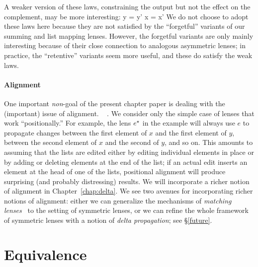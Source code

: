 \iffull
A weaker version of these laws, constraining the output but not the effect
on the complement, may be more interesting:
%
{
  {y = y'}
  {x = x'}
}
%
  We do not choose to adopt these laws here because they are not satisfied
  by the ``forgetful'' variants of our summing and list mapping lenses.
  However, the forgetful variants are only mainly interesting because of
  their close connection to analogous asymmetric lenses; in practice, the
  ``retentive'' variants seem more useful, and these do satisfy the weak
   laws.  
\fi %

\paragraph*{Alignment}\label{firstalign}

One important {\em non}-goal of the present \ifdissertation chapter \else
paper \fi is dealing with the \ifcomplement (important) \fi issue of
\ifdissertation alignment. ~%
\cite{Boomerang07,Matching10}. \fi We consider
only the simple case of lenses 
that work ``positionally.''  For example, the lens $e^\star$ in the example
will always use $e$ to propagate
changes between the first element of $x$ and the first element of $y$,
between the second element of $x$ and the second of $y$, and so on.  This
amounts to assuming that the lists are edited either by editing individual
elements in place or by adding or deleting elements at the end of the list;
if an actual edit inserts an element at the head of one of the lists,
positional alignment will produce surprising (and probably distressing)
results.
\ifdissertation
We will incorporate a richer notion of alignment in
Chapter~\ref{chap:delta}.
\else
We see two avenues for incorporating richer notions of alignment:
either we can generalize the mechanisms of {\em matching
  lenses}~\cite{Matching10} to the setting of symmetric lenses, or we can
refine the whole framework of symmetric lenses with a notion of {\em delta
propagation}; see \S\ref{future}.
\fi%

\section{Equivalence}\label{equiv}

